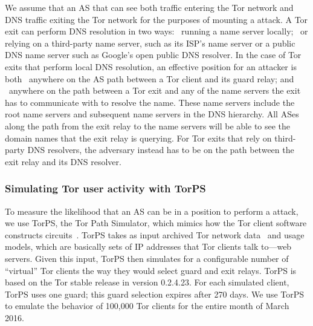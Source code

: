 We assume that an AS that can see both traffic entering the Tor network 
and DNS traffic exiting the Tor network for the purposes of mounting
a \name attack. 
A Tor exit can perform DNS resolution in two ways: \first~running a name server
locally; \second~or relying on a third-party name server, such as its ISP's name
server or a public DNS name server such as Google's open public DNS
resolver.  In the case of Tor
exits that perform local DNS resolution, an effective position for an attacker
is both \first~anywhere on the AS path between a Tor client and its
guard relay; and \second~anywhere on the path between a Tor exit and any of the
name servers the exit has to communicate with to resolve the name.
These name servers include the root name servers and subsequent name servers in
the DNS hierarchy.  All ASes along the path from the exit relay
to the name servers will be able to see the domain names that the exit
relay is querying.
For Tor exits that rely on third-party DNS resolvers, the
adversary instead has to be on the path between the exit relay and its DNS
resolver.

\subsubsection{Simulating Tor user activity with TorPS}

To measure the likelihood that an AS can be in a position to perform a \name
attack, we use TorPS, the Tor Path Simulator, which mimics how the Tor client
software constructs circuits~\cite{TorPS}.  TorPS takes as input archived Tor
network data~\cite{collector} and usage models, which are basically sets of IP
addresses that Tor clients talk to---\eg web servers.  Given this input, TorPS
then simulates for a configurable number of ``virtual'' Tor clients the way they
would select guard and exit relays.  TorPS is based on the Tor stable release in
version 0.2.4.23.  For each simulated client, TorPS uses one guard; this guard
selection expires after 270 days. We use TorPS to emulate the behavior of
100,000 Tor clients for the entire month of March 2016.


